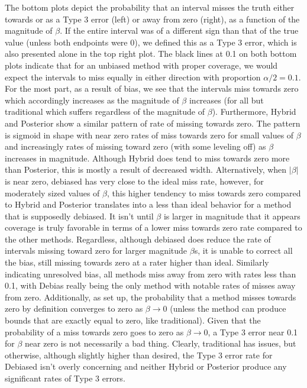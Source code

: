 The bottom plots depict the probability that an interval misses the truth either towards or as a Type 3 error (left) or away from zero (right), as a function of the magnitude of $\beta$. If the entire interval was of a different sign than that of the true value (unless both endpoints were 0), we defined this as a Type 3 error, which is also presented alone in the top right plot. The black lines at 0.1 on both bottom plots indicate that for an unbiased method with proper coverage, we would expect the intervals to miss equally in either direction with proportion $\alpha / 2 = 0.1$. For the most part, as a result of bias, we see that the intervals miss towards zero which accordingly increases as the magnitude of $\beta$ increases (for all but traditional which suffers regardless of the magnitude of $\beta$). Furthermore, Hybrid and Posterior show a similar pattern of rate of missing towards zero. The pattern is sigmoid in shape with near zero rates of miss towards zero for small values of $\beta$ and increasingly rates of missing toward zero (with some leveling off) as $\beta$ increases in magnitude. Although Hybrid does tend to miss towards zero more than Posterior, this is mostly a result of decreased width. Alternatively, when $|\beta|$ is near zero, debiased has very close to the ideal miss rate, however, for moderately sized values of $\beta$, this higher tendency to miss towards zero compared to Hybrid and Posterior translates into a less than ideal behavior for a method that is supposedly debiased. It isn't until $\beta$ is larger in magnitude that it appears coverage is truly favorable in terms of a lower miss towards zero rate compared to the other methods. Regardless, although debiased does reduce the rate of intervals missing toward zero for larger magnitude $\beta$s, it is unable to correct all the bias, still missing towards zero at a rater higher than ideal. Similarly indicating unresolved bias, all methods miss away from zero with rates less than 0.1, with Debias really being the only method with notable rates of misses away from zero.  Additionally, as set up, the probability that a method misses towards zero by definition converges to zero as $\beta \rightarrow 0$ (unless the method can produce bounds that are exactly equal to zero, like traditional). Given that the probability of a miss towards zero goes to zero as $\beta \rightarrow 0$, a Type 3 error near 0.1 for $\beta$ near zero is not necessarily a bad thing. Clearly, traditional has issues, but otherwise, although slightly higher than desired, the Type 3 error rate for Debiased isn't overly concerning and neither Hybrid or Posterior produce any significant rates of Type 3 errors.


